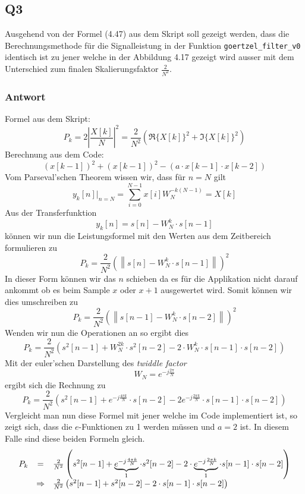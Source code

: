 \newpage
\subsection{Q3}
Ausgehend von der Formel (4.47) aus dem Skript soll gezeigt werden, dass die
Berechnungsmethode für die Signalleistung in der Funktion
\lstinline{goertzel_filter_v0} identisch ist zu jener welche in der Abbildung
4.17 gezeigt wird ausser mit dem Unterschied zum finalen Skalierungsfaktor 
$\frac{2}{N^2}$.

\subsubsection*{Antwort}
Formel aus dem Skript:
\[
	P_k
	= 2 \left| \frac{X[k]}{N} \right|^2
	= \frac{2}{N^2} \left( \Re\{X[k]\}^2 + \Im\{X[k]\}^2 \right)
\]
Berechnung aus dem Code:
\[
	\left( x[k-1] \right)^2
		+ \left( x[k-1] \right)^2
		- \left( a \cdot x[k-1] \cdot x[k-2] \right)
\]
Vom Parseval'schen Theorem wissen wir, dass für $n = N$ gilt
\[
	y_k[n] |_{n=N}
	= \sum_{i=0}^{N-1} x[i] W_N^{-k(N-1)}
	= X[k]
\]
Aus der Transferfunktion
\[
	y_k[n] = s[n] - W_N^k \cdot s[n-1]
\]
können wir nun die Leistungsformel mit den Werten aus dem Zeitbereich
formulieren zu
\[
	P_k = \frac{2}{N^2} \left(
		\left\lVert s[n] - W_N^k \cdot s[n-1] \right\rVert
	\right)^2
\]
In dieser Form können wir das $n$ schieben da es für die Applikation
nicht darauf ankommt ob es beim Sample $x$ oder $x+1$ ausgewertet wird.
Somit können wir dies umschreiben zu
\[
	P_k = \frac{2}{N^2} \left(
		\left\lVert s[n-1] - W_N^k \cdot s[n-2] \right\rVert
	\right)^2
\]
Wenden wir nun die Operationen an so ergibt dies
\[
	P_k
	= \frac{2}{N^2} \left(
		s^2[n-1] + W_N^{2k} \cdot s^2[n-2]
		- 2 \cdot W_N^k \cdot s[n-1] \cdot s[n-2]
	\right)
\]
Mit der euler'schen Darstellung des \emph{twiddle factor}
\[
	W_N = e^{-j\frac{2 \pi}{N}}
\] 
ergibt sich die Rechnung zu
\[
	P_k
	= \frac{2}{N^2} \left(
		s^2[n-1] + e^{-j\frac{4 \pi k}{N}} \cdot s[n-2]
		- 2 e^{-j\frac{2 \pi k}{N}} \cdot s[n-1] \cdot s[n-2] 
	\right)
\]
Vergleicht man nun diese Formel mit jener welche im Code implementiert ist,
so zeigt sich, dass die $e$-Funktionen zu 1 werden müssen und $a=2$ ist. In
diesem Falle sind diese beiden Formeln gleich.
\[
	\begin{array}{r c l}
	P_k & = & \frac{2}{N^2} \left(
		s^2[n-1] +
		\underbrace{e^{-j\frac{4 \pi k}{N}}}_{1} \cdot s^2[n-2]
		- 2 \cdot \underbrace{e^{-j\frac{2 \pi k}{N}}}_{1} \cdot s[n-1] \cdot s[n-2] 
	\right) \\
	& \Rightarrow & \frac{2}{N^2} \left(
		s^2[n-1] + s^2[n-2] - 2 \cdot s[n-1] \cdot s[n-2] 
	\right)
	\end{array}
\]


